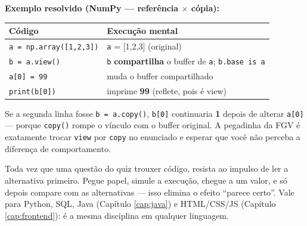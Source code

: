 \textbf{Exemplo resolvido (NumPy --- referência $\times$ cópia):}

\begin{center}
\begin{tabular}{@{}p{5.4cm}p{5.4cm}@{}}
\toprule
\textbf{Código} & \textbf{Execução mental} \\
\midrule
\texttt{a = np.array([1,2,3])} & \texttt{a} = [1,2,3] (original) \\
\texttt{b = a.view()} & \texttt{b} \textbf{compartilha} o buffer de \texttt{a}; \texttt{b.base is a} \\
\texttt{a[0] = 99} & muda o buffer compartilhado \\
\texttt{print(b[0])} & imprime \textbf{99} (reflete, pois é view) \\
\bottomrule
\end{tabular}
\end{center}

Se a segunda linha fosse \texttt{b = a.copy()}, \texttt{b[0]} continuaria
\textbf{1} depois de alterar \texttt{a[0]} --- porque \texttt{copy()} rompe o
vínculo com o buffer original. A pegadinha da FGV é exatamente trocar
\texttt{view} por \texttt{copy} no enunciado e esperar que você não perceba a
diferença de comportamento.

\begin{comosair}
Toda vez que uma questão do quiz trouxer código, resista ao impulso de ler a
alternativa primeiro. Pegue papel, simule a execução, chegue a um valor, e só
depois compare com as alternativas --- isso elimina o efeito ``parece
certo''. Vale para Python, SQL, Java (Capítulo \ref{cap:java}) e
HTML/CSS/JS (Capítulo \ref{cap:frontend}): é a mesma disciplina em qualquer
linguagem.
\end{comosair}

